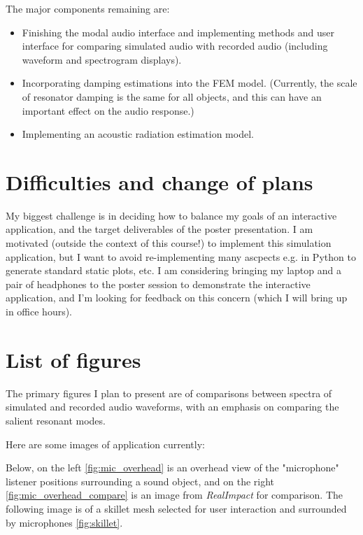 \documentclass[12pt]{article}
\begin{document}
The major components remaining are:
\begin{itemize}
    \item Finishing the modal audio interface and implementing methods and user interface for comparing simulated audio with recorded audio (including waveform and spectrogram displays).
    \item Incorporating damping estimations into the FEM model. (Currently, the scale of resonator damping is the same for all objects, and this can have an important effect on the audio response.)
    \item Implementing an acoustic radiation estimation model.
\end{itemize}

\section{Difficulties and change of plans}

My biggest challenge is in deciding how to balance my goals of an interactive application, and the target deliverables of the poster presentation.
I am motivated (outside the context of this course!) to implement this simulation application, but I want to avoid re-implementing many ascpects e.g. in Python to generate standard static plots, etc.
I am considering bringing my laptop and a pair of headphones to the poster session to demonstrate the interactive application, and I'm looking for feedback on this concern (which I will bring up in office hours).

\section{List of figures}

The primary figures I plan to present are of comparisons between spectra of simulated and recorded audio waveforms, with an emphasis on comparing the salient resonant modes.

Here are some images of application currently:

Below, on the left \ref{fig:mic_overhead} is an overhead view of the "microphone" listener positions surrounding a sound object, and on the right \ref{fig:mic_overhead_compare} is an image from \textit{RealImpact} \cite{clarke_realimpact_2023} for comparison.
The following image is of a skillet mesh selected for user interaction and surrounded by microphones \ref{fig:skillet}.
\end{document}

